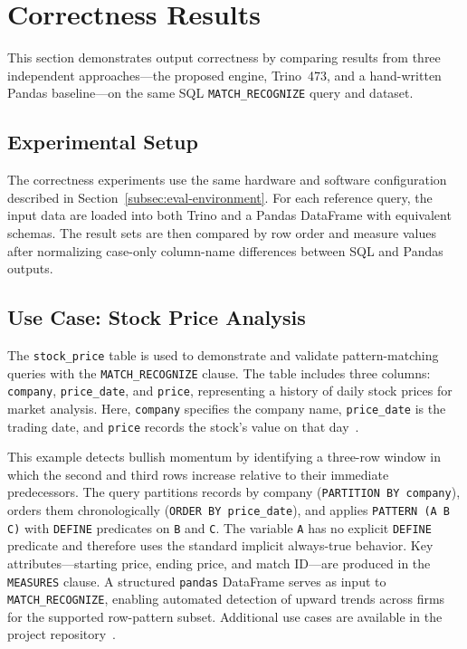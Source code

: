 \section{Correctness Results}
\label{sec:eval-correctness}

This section demonstrates output correctness by comparing results from
three independent approaches---the proposed engine, Trino~473, and a
hand-written Pandas baseline---on the same SQL \texttt{MATCH\_RECOGNIZE}
query and dataset.

\subsection{Experimental Setup}
\label{subsec:correctness-setup}

The correctness experiments use the same hardware and software
configuration described in Section~\ref{subsec:eval-environment}.
For each reference query, the input data are loaded into both Trino
and a Pandas DataFrame with equivalent schemas.  The result sets are
then compared by row order and measure values after normalizing
case-only column-name differences between SQL and Pandas outputs.

\subsection{Use Case: Stock Price Analysis}
\label{subsec:eval-stock-price}

The \texttt{stock\_price} table is used to demonstrate and validate
pattern-matching queries with the \texttt{MATCH\_RECOGNIZE} clause.
The table includes three columns: \texttt{company}, \texttt{price\_date},
and \texttt{price}, representing a history of daily stock prices for
market analysis.  Here, \texttt{company} specifies the company name,
\texttt{price\_date} is the trading date, and \texttt{price} records
the stock's value on that day~\cite{petkovic2022rpr}.

This example detects bullish momentum by identifying a three-row
window in which the second and third rows increase relative to their
immediate predecessors.  The query partitions records by company
(\texttt{PARTITION BY company}), orders them chronologically
(\texttt{ORDER BY price\_date}), and applies \texttt{PATTERN (A B C)}
with \texttt{DEFINE} predicates on \texttt{B} and \texttt{C}.  The
variable \texttt{A} has no explicit \texttt{DEFINE} predicate and
therefore uses the standard implicit always-true behavior.  Key
attributes---starting price, ending price, and match ID---are produced
in the \texttt{MEASURES} clause.  A structured \texttt{pandas}
DataFrame serves as input to \texttt{MATCH\_RECOGNIZE}, enabling
automated detection of upward trends across firms for the supported
row-pattern subset.
Additional use cases are available in the project
repository~\cite{monierashraf2025rowmatch}.

